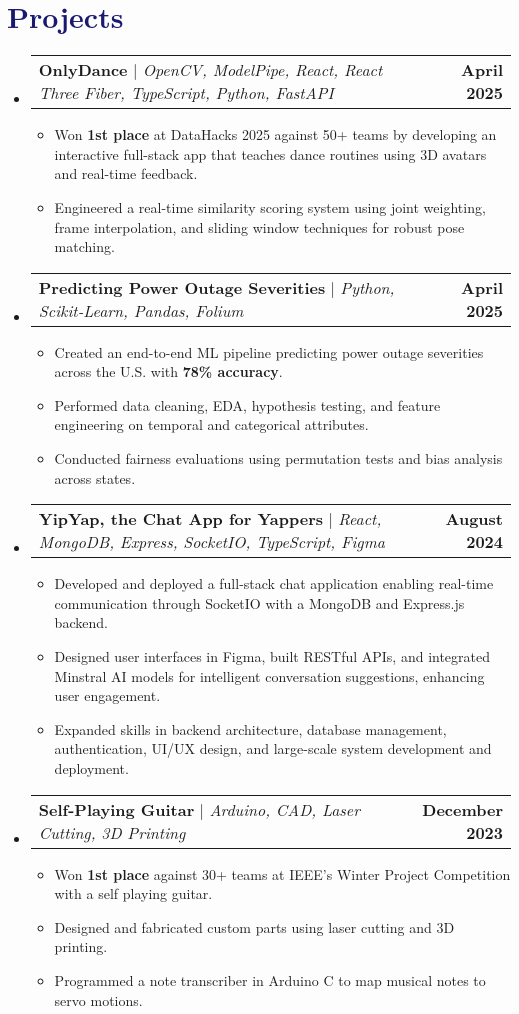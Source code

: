 \documentclass[letterpaper,11pt]{article}
\makeatletter
\newcommand{\resumeItem}[1]{
  \item\small{
    {#1 \vspace{-2pt}}
  }
}
\newcommand{\resumeProjectHeading}[2]{
    \item
    \begin{tabular*}{1.001\textwidth}{l@{\extracolsep{\fill}}r}
      \small#1 & \textbf{\small #2}\\
    \end{tabular*}\vspace{-7pt}
}
\newcommand{\resumeSubHeadingListStart}{\begin{itemize}[leftmargin=0.0in, label={}]}
\newcommand{\resumeSubHeadingListEnd}{\end{itemize}}
\newcommand{\resumeItemListStart}{\begin{itemize}}
\newcommand{\resumeItemListEnd}{\end{itemize}\vspace{-5pt}}
\newcommand\accentColor{MidnightBlue}
\makeatother
\begin{document}
\section{\textcolor{\accentColor}{Projects}}
\resumeSubHeadingListStart
\resumeProjectHeading
    {\textbf{OnlyDance} $|$ \emph{OpenCV, ModelPipe, React, React Three Fiber, TypeScript, Python, FastAPI}}{April 2025}
    \resumeItemListStart
        \resumeItem{Won \textbf{1st place} at DataHacks 2025 against 50+ teams by developing an interactive full-stack app that teaches dance routines using 3D avatars and real-time feedback.}
        \resumeItem{Engineered a real-time similarity scoring system using joint weighting, frame interpolation, and sliding window techniques for robust pose matching.}
    \resumeItemListEnd
\vspace{-15pt}
\resumeProjectHeading
    {\textbf{Predicting Power Outage Severities} $|$ \emph{Python, Scikit-Learn, Pandas, Folium}}{April 2025}
    \resumeItemListStart
        \resumeItem{Created an end-to-end ML pipeline predicting power outage severities across the U.S. with \textbf{78\% accuracy}.}
        \resumeItem{Performed data cleaning, EDA, hypothesis testing, and feature engineering on temporal and categorical attributes.}
        \resumeItem{Conducted fairness evaluations using permutation tests and bias analysis across states.}
    \resumeItemListEnd
\vspace{-15pt}
\resumeProjectHeading
    {\textbf{YipYap, the Chat App for Yappers} $|$ \emph{React, MongoDB, Express, SocketIO, TypeScript, Figma}}{August 2024}
    \resumeItemListStart
        \resumeItem{Developed and deployed a full-stack chat application enabling real-time communication through SocketIO with a MongoDB and Express.js backend.}
        \resumeItem{Designed user interfaces in Figma, built RESTful APIs, and integrated Minstral AI models for intelligent conversation suggestions, enhancing user engagement.}
        \resumeItem{Expanded skills in backend architecture, database management, authentication, UI/UX design, and large-scale system development and deployment.}
    \resumeItemListEnd
\vspace{-15pt}
\resumeProjectHeading
    {\textbf{Self-Playing Guitar} $|$ \emph{Arduino, CAD, Laser Cutting, 3D Printing}}{December 2023}
    \resumeItemListStart
        \resumeItem{Won \textbf{1st place} against 30+ teams at IEEE's Winter Project Competition with a self playing guitar.}
        \resumeItem{Designed and fabricated custom parts using laser cutting and 3D printing.}
        \resumeItem{Programmed a note transcriber in Arduino C to map musical notes to servo motions.}
    \resumeItemListEnd
\resumeSubHeadingListEnd
\vspace{-15pt}
\end{document}
